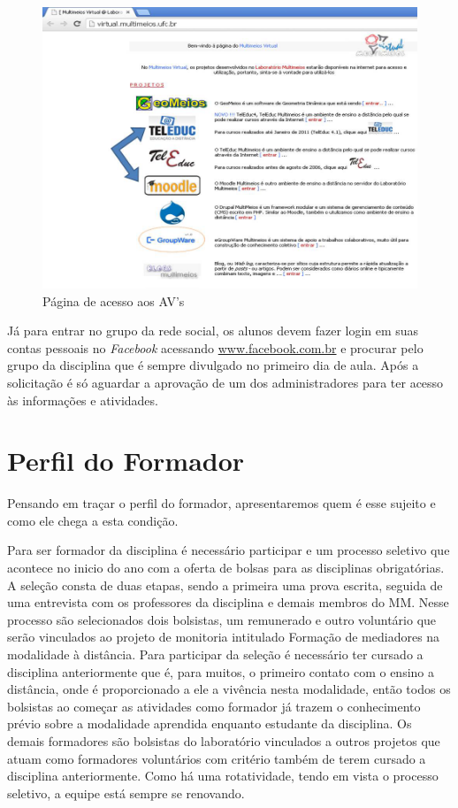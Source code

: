 \begin{figure}[!ht]
    \centering
    \includegraphics[scale=.5]{f2.png}
    \caption{Página de acesso aos AV’s}
    \label{fig:acessoav}
\end{figure}

Já para entrar no grupo da rede social, os alunos devem fazer login em suas contas pessoais no \textit{Facebook} acessando \underline{www.facebook.com.br} e procurar pelo grupo da disciplina que é sempre divulgado no primeiro dia de aula. Após a solicitação é só aguardar a aprovação de um dos administradores para ter acesso às informações e atividades.

\section{Perfil do Formador}

Pensando em traçar o perfil do formador, apresentaremos quem é esse sujeito e como ele chega a esta condição. 

Para ser formador da disciplina é necessário participar e um processo seletivo que acontece no inicio do ano com a oferta de bolsas para as disciplinas obrigatórias. A seleção consta de duas etapas, sendo a primeira uma prova escrita, seguida de uma entrevista com os professores da disciplina e demais membros do MM. Nesse processo são selecionados dois bolsistas, um remunerado e outro voluntário que serão vinculados ao projeto de monitoria intitulado Formação de mediadores na modalidade à distância. Para participar da seleção é necessário ter cursado a disciplina anteriormente que é, para muitos, o primeiro contato com o ensino a distância, onde é proporcionado a ele a vivência nesta modalidade, então todos os bolsistas ao começar as atividades como formador já trazem o conhecimento prévio sobre a modalidade aprendida enquanto estudante da disciplina.  Os demais formadores são bolsistas do laboratório vinculados a outros projetos que atuam como formadores voluntários com critério também de terem cursado a disciplina anteriormente. Como há uma rotatividade, tendo em vista o processo seletivo, a equipe está sempre se renovando. 

